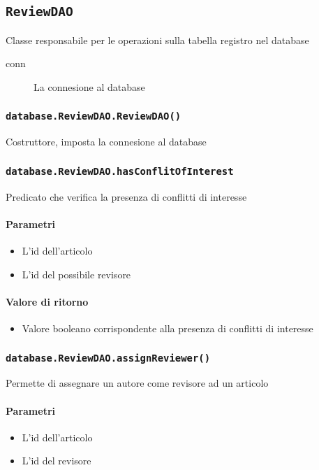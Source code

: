 \subsection{\texttt{ReviewDAO}}
Classe responsabile per le operazioni sulla tabella registro nel database
\begin{description}
\item[conn] La connesione al database
\end{description}

\subsubsection{\texttt{database.ReviewDAO.ReviewDAO()}}
Costruttore, imposta la connesione al database

\subsubsection{\texttt{database.ReviewDAO.hasConflitOfInterest}}
Predicato che verifica la presenza di conflitti di interesse
\paragraph{Parametri}
\begin{itemize}
\item L'id dell'articolo
\item L'id del possibile revisore
\end{itemize}
\paragraph{Valore di ritorno}
\begin{itemize}
\item Valore booleano corrispondente alla presenza di conflitti di interesse
\end{itemize}

\subsubsection{\texttt{database.ReviewDAO.assignReviewer()}}
Permette di assegnare un autore come revisore ad un articolo
\paragraph{Parametri}
\begin{itemize}
\item L'id dell'articolo
\item L'id del revisore
\end{itemize}

